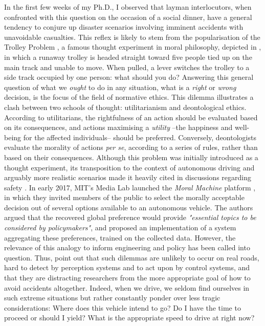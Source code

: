 In the first few weeks of my Ph.D., I observed that layman interlocutors, when confronted with this question on the occasion of a social dinner, have a general tendency to conjure up disaster scenarios involving imminent accidents with unavoidable casualties. This reflex is likely to stem from the popularisation of the Trolley Problem \citep{Foot1967}, a famous thought experiment in moral philosophy, depicted in , in which a runaway trolley is headed straight toward five people tied up on the main track and unable to move. When pulled, a lever switches the trolley to a side track occupied by one person: what should you do? Answering this general question of what we \emph{ought} to do in any situation, what is a \emph{right} or \emph{wrong} decision, is the focus of the field of {normative ethics}. This dilemma illustrates a clash between two schools of thought: utilitarianism and deontological ethics. According to utilitarians, the rightfulness of an action should be evaluated based on its consequences, and actions maximising a \emph{utility} --the happiness and well-being for the affected individuals-- should be preferred. Conversely, deontologists evaluate the morality of actions \emph{per se}, according to a series of rules, rather than based on their consequences. Although this problem was initially introduced as a thought experiment, its transposition to the context of autonomous driving and arguably more realistic scenarios made it heavily cited in discussions regarding safety \citep[e.g.][]{Lin2015,Bonnefon2016,Gogoll2017}. In early 2017, MIT's Media Lab launched the \emph{Moral Machine} platform \citep{Awad2018}, in which they invited members of the public to select the morally acceptable decision out of several options available to an autonomous vehicle. The authors argued that the recovered global preference would provide \emph{"essential topics to be considered by policymakers"}, and \citep{Noothigattu2018} proposed an implementation of a system aggregating these preferences, trained on the collected data. However, the relevance of this analogy to inform engineering and policy has been called into question. Thus, \citet{DeFreitas2019} point out that such dilemmas are unlikely to occur on real roads, hard to detect by perception systems and to act upon by control systems, and that they are distracting researchers from the more appropriate goal of how to avoid accidents altogether. Indeed, when we drive, we seldom find ourselves in such extreme situations but rather constantly ponder over less tragic considerations: Where does this vehicle intend to go? Do I have the time to proceed or should I yield? What is the appropriate speed to drive at right now? 
